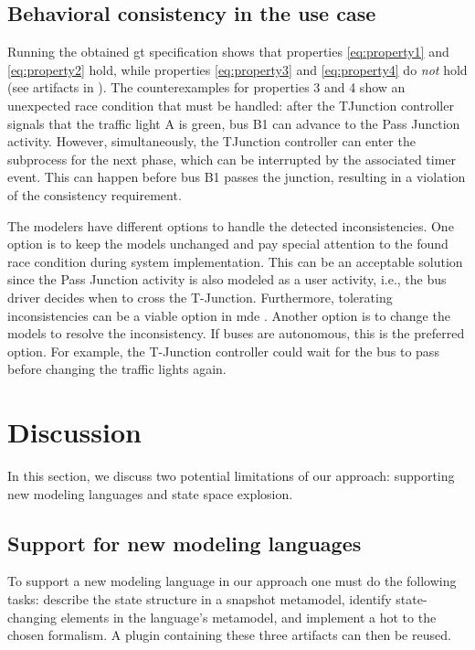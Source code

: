 \documentclass{jot}
\begin{document}
\subsection{Behavioral consistency in the use case}
Running the obtained \gls*{gt} specification shows that properties \eqref{eq:property1} and \eqref{eq:property2} hold, while properties \eqref{eq:property3} and \eqref{eq:property4} do \textit{not} hold (see artifacts in \cite{krauterArtifactsBehavioralConsistency2023}).
The counterexamples for properties 3 and 4 show an unexpected race condition that must be handled:
after the TJunction controller signals that the traffic light A is green, bus B1 can advance to the \textsf{Pass Junction} activity.
However, simultaneously, the TJunction controller can enter the subprocess for the next phase, which can be interrupted by the associated timer event.
This can happen before bus B1 passes the junction, resulting in a violation of the consistency requirement.

The modelers have different options to handle the detected inconsistencies.
One option is to keep the models unchanged and pay special attention to the found race condition during system implementation.
This can be an acceptable solution since the \textsf{Pass Junction} activity is also modeled as a user activity, i.e., the bus driver decides when to cross the T-Junction.
Furthermore, tolerating inconsistencies can be a viable option in \gls*{mde} \cite{weidmannToleranceModelDrivenEngineering2021}.
Another option is to change the models to resolve the inconsistency.
If buses are autonomous, this is the preferred option.
For example, the T-Junction controller could wait for the bus to pass before changing the traffic lights again.


\section{Discussion} \label{sec:discussion}
In this section, we discuss two potential limitations of our approach: supporting new modeling languages and state space explosion.

\subsection{Support for new modeling languages}
To support a new modeling language in our approach one must do the following tasks: describe the state structure in a snapshot metamodel, identify state-changing elements in the language's metamodel, and implement a \gls*{hot} to the chosen formalism.
A plugin containing these three artifacts can then be reused.
\end{document}
